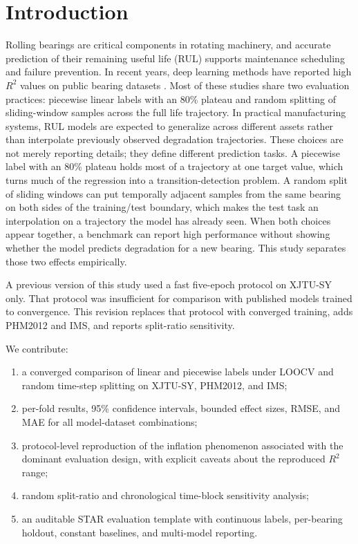 \documentclass[pdflatex,sn-mathphys-num]{sn-jnl}
\begin{document}
\section{Introduction}
Rolling bearings are critical components in rotating machinery, and accurate prediction of their remaining useful life (RUL) supports maintenance scheduling and failure prevention. In recent years, deep learning methods have reported high $R^2$ values on public bearing datasets \cite{rul_lstm_uq_2022,reg_lstm_2021,gru_tim_2021,transformer_tim_2023}. Most of these studies share two evaluation practices: piecewise linear labels with an 80\% plateau and random splitting of sliding-window samples across the full life trajectory.
In practical manufacturing systems, RUL models are expected to generalize across different assets rather than interpolate previously observed degradation trajectories. These choices are not merely reporting details; they define different prediction tasks. A piecewise label with an 80\% plateau holds most of a trajectory at one target value, which turns much of the regression into a transition-detection problem. A random split of sliding windows can put temporally adjacent samples from the same bearing on both sides of the training/test boundary, which makes the test task an interpolation on a trajectory the model has already seen. When both choices appear together, a benchmark can report high performance without showing whether the model predicts degradation for a new bearing. This study separates those two effects empirically.

A previous version of this study used a fast five-epoch protocol on XJTU-SY only. That protocol was insufficient for comparison with published models trained to convergence. This revision replaces that protocol with converged training, adds PHM2012 and IMS, and reports split-ratio sensitivity.

We contribute:
\begin{enumerate}
    \item a converged comparison of linear and piecewise labels under LOOCV and random time-step splitting on XJTU-SY, PHM2012, and IMS;
    \item per-fold results, 95\% confidence intervals, bounded effect sizes, RMSE, and MAE for all model-dataset combinations;
    \item protocol-level reproduction of the inflation phenomenon associated with the dominant evaluation design, with explicit caveats about the reproduced $R^2$ range;
    \item random split-ratio and chronological time-block sensitivity analysis;
    \item an auditable STAR evaluation template with continuous labels, per-bearing holdout, constant baselines, and multi-model reporting.
\end{enumerate}
\end{document}

